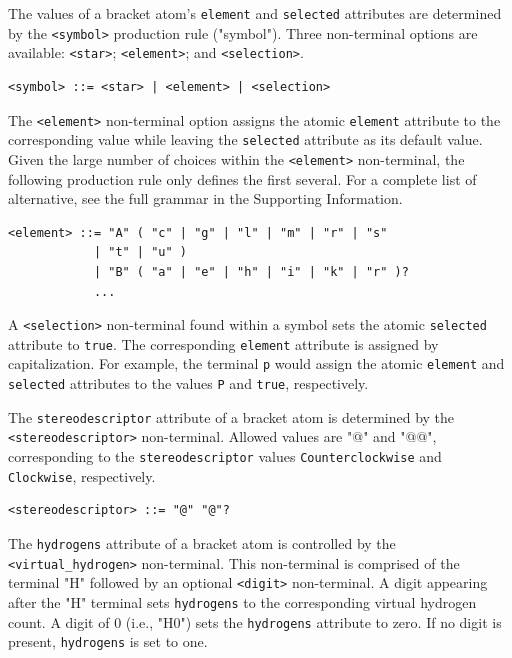 \documentclass{article}
\def\ttt{\texttt}
\begin{document}
The values of a bracket atom's \ttt{element} and \ttt{selected} attributes are determined by the \ttt{<symbol>} production rule ("symbol"). Three non-terminal options are available: \ttt{<star>}; \ttt{<element>}; and \ttt{<selection>}.

\begin{lstlisting}
<symbol> ::= <star> | <element> | <selection>
\end{lstlisting}

The \ttt{<element>} non-terminal option assigns the atomic \ttt{element} attribute to the corresponding value while leaving the \ttt{selected} attribute as its default value. Given the large number of choices within the \ttt{<element>} non-terminal, the following production rule only defines the first several. For a complete list of alternative, see the full grammar in the Supporting Information.

\begin{lstlisting}
<element> ::= "A" ( "c" | "g" | "l" | "m" | "r" | "s"
            | "t" | "u" )
            | "B" ( "a" | "e" | "h" | "i" | "k" | "r" )?
            ...
\end{lstlisting}

A \ttt{<selection>} non-terminal found within a symbol sets the atomic \ttt{selected} attribute to \ttt{true}. The corresponding \ttt{element} attribute is assigned by capitalization. For example, the terminal \ttt{p} would assign the atomic \ttt{element} and \ttt{selected} attributes to the values \ttt{P} and \ttt{true}, respectively.

The \ttt{stereodescriptor} attribute of a bracket atom is determined by the \ttt{<stereodescriptor>} non-terminal. Allowed values are "@" and "@@", corresponding to the \ttt{stereodescriptor} values \ttt{Counterclockwise} and \ttt{Clockwise}, respectively.

\begin{lstlisting}
<stereodescriptor> ::= "@" "@"?
\end{lstlisting}

The \ttt{hydrogens} attribute of a bracket atom is controlled by the \\ \ttt{<virtual{\_}hydrogen>} non-terminal. This non-terminal is comprised of the terminal "H" followed by an optional \ttt{<digit>} non-terminal. A digit appearing after the "H" terminal sets \ttt{hydrogens} to the corresponding virtual hydrogen count. A digit of 0 (i.e., "H0") sets the \ttt{hydrogens} attribute to zero. If no digit is present, \ttt{hydrogens} is set to one.
\end{document}
